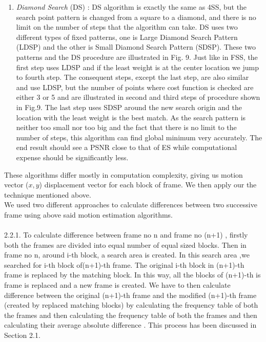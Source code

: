 \documentclass[twocolumn,twoside]{article}
\begin{document}
\begin{enumerate}[i]
\item { \textit {Diamond Search} (DS) : DS algorithm is exactly the same as 4SS, but the search point pattern is changed from a square to a diamond, and there is no limit on the number of steps that the algorithm can take. DS uses two different types of fixed patterns, one is Large Diamond Search Pattern (LDSP) and the other is Small Diamond Search Pattern (SDSP). These two patterns and the DS procedure are illustrated in Fig. 9. Just like in FSS, the first step uses LDSP and if the least weight is at the center location we jump to fourth step. The consequent steps, except the last step, are also similar and use LDSP, but the number of points where cost function is checked are either 3 or 5 and are illustrated in second and third steps of procedure shown in Fig.9. The last step uses SDSP around the new search origin and the location with the least weight is the best match. As the search pattern is neither too small nor too big and the fact that there is no limit to the number of steps, this algorithm can find global minimum very accurately. The end result should see a PSNR close to that of ES while computational expense should be significantly less.}

\end{enumerate} 

\vspace{0.5cm}

These algorithms differ mostly in computation complexity, giving us motion vector ($x,y$) displacement vector for each block of frame. We then apply our the technique mentioned above.\\

We used two different approaches to calculate differences between two successive frame using above said motion estimation algorithms.\\\\
 
2.2.1. To calculate difference between frame no n and frame no (n+1) , firstly both the frames are divided into equal number of equal sized blocks. Then in frame no n, around i-th block, a search area is created. In this search area ,we searched for i-th block of(n+1)-th frame. The original i-th block in (n+1)-th frame is replaced by the matching block. In this way, all the blocks of (n+1)-th is frame is replaced and a new frame is created. We have to then calculate difference between the original (n+1)-th frame and the modified (n+1)-th frame (created by replaced matching blocks) by calculating the frequency table of both the frames and then calculating the frequency table of both the frames and then calculating their average absolute difference . This process has been discussed in Section 2.1.\\
\end{document}
